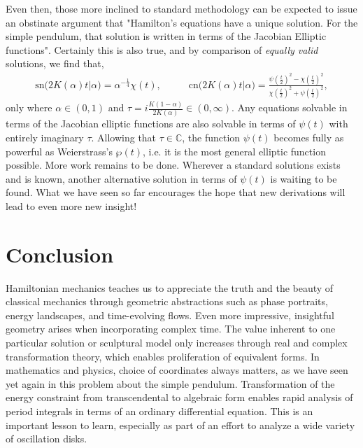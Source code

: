 \documentclass[nofootinbib,preprint]{revtex4-1}
\begin{document}
Even then, those more inclined to standard methodology can be expected to issue an obstinate 
argument that "Hamilton's equations have a unique solution. For the simple pendulum, that 
solution is written in terms of the Jacobian Elliptic functions". Certainly this is also true,
and by comparison of \textit{equally valid} solutions, we find that,
\begin{eqnarray}
\text{sn}\big(2K(\alpha)t\big|\alpha\big) = \alpha^{-\frac{1}{4}}\chi(t)  , \;\;\;\;\;\;\;\;\;\; 
\text{cn}\big(2K(\alpha)t\big|\alpha\big) = \frac{\psi(\tfrac{t}{2})^2 - \chi(\tfrac{t}{2})^2
}{\chi(\tfrac{t}{2})^2 + \psi(\tfrac{t}{2})^2 },\nonumber
\end{eqnarray}
only where $\alpha \in (0,1)$ and $\tau = i\frac{K(1-\alpha)}{2K(\alpha)} \in (0,\infty)$.
Any equations solvable in terms of the Jacobian elliptic functions are also solvable 
in terms of $\psi(t)$ with entirely imaginary $\tau$. Allowing that 
$\tau \in \mathbb{C}$, the function $\psi(t)$ becomes fully as powerful as Weierstrass's 
$\wp(t)$, i.e. it is the most general elliptic function possible. More work remains to 
be done. Wherever a standard solutions exists and is known, another alternative solution 
in terms of $\psi(t)$ is waiting to be found. What we have seen so far encourages the 
hope that new derivations will lead to even more new insight!

\section{Conclusion}

Hamiltonian mechanics teaches us to appreciate the truth and the beauty of classical mechanics 
through geometric abstractions such as phase portraits, energy landscapes, and time-evolving flows. 
Even more impressive, insightful geometry arises when incorporating complex time. The value inherent 
to one particular solution or sculptural model only increases through real and complex transformation 
theory, which enables proliferation of equivalent forms. In mathematics and physics, choice of 
coordinates always matters, as we have seen yet again in this problem about the simple pendulum. 
Transformation of the energy constraint from transcendental to algebraic form enables rapid analysis 
of period integrals in terms of an ordinary differential equation.  This is an important lesson to 
learn, especially as part of an effort to analyze a wide variety of oscillation disks.
\end{document}
